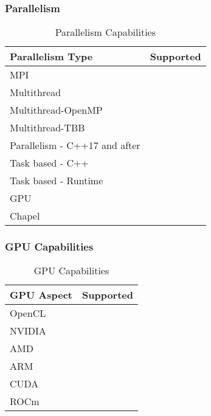 \subsubsection{Parallelism}
\begin{table}[h!]
    \centering
    \begin{tabular}{|l|c|}
        \hline
        Parallelism Type & Supported \\
        \hline
        MPI &  \\
        Multithread &  \\
        Multithread-OpenMP &  \\
        Multithread-TBB &  \\
        Parallelism - C++17 and after &  \\
        Task based - C++ &  \\
        Task based - Runtime &  \\
        GPU &  \\
        Chapel &  \\
        \hline
    \end{tabular}
    \caption{Parallelism Capabilities}
\end{table}

\subsubsection{GPU Capabilities}
\begin{table}[h!]
    \centering
    \begin{tabular}{|l|c|}
        \hline
        GPU Aspect & Supported \\
        \hline
        OpenCL &  \\
        NVIDIA &  \\
        AMD &  \\
        ARM &  \\
        CUDA &  \\
        ROCm &  \\
        \hline
    \end{tabular}
    \caption{GPU Capabilities}
\end{table}

